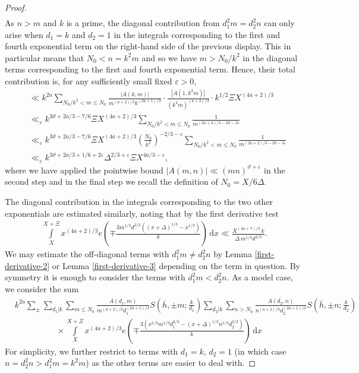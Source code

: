 \documentclass[a4paper,10pt,twoside]{amsart}
\theoremstyle{definition}
\numberwithin{equation}{section}
\newcommand\eps{\varepsilon}
\renewcommand\:{\colon}
\begin{document}
\begin{proof}
\begin{align*}
\end{align*}
As $n>m$ and $k$ is a prime, the diagonal contribution from $d_1^2m=d_2^2n$ can only arise when $d_1=k$ and $d_2=1$ in the integrals corresponding to the first and fourth exponential term on the right-hand side of the previous display. This in particular means that $N_0<n=k^2m$ and so we have $m>N_0/k^2$ in the diagonal terms corresponding to the first and fourth exponential term. Hence, their total contribution is, for any sufficiently small fixed $\varepsilon>0$,
\begin{align}\label{Estimate-2}
&\ll k^{2a}\sum_{N_0/k^2<m\leq N_0}\frac{\left|A\left(k,m\right)\right|}{m^{(a+2)/3}k^{(2a+1)/3}}\cdot\frac{\left|A\left(1,k^2m\right)\right|}{\left(k^2m\right)^{(a+2)/3}}\cdot k^{1/2}\Xi X^{(4a+2)/3} \nonumber\\
&\ll_\eps k^{3\vartheta+2a/3-7/6}\Xi X^{(4a+2)/3}\sum_{N_0/k^2<m\leq N_0}\frac1{m^{(2a+4)/3-2\vartheta-2\varepsilon}} \nonumber\\
&\ll_\eps k^{3\vartheta+2a/3-7/6}\Xi X^{(4a+2)/3}\left(\frac{N_0}{k^2}\right)^{-2/3-\varepsilon}\sum_{N_0/k^2<m\leq N_0}\frac1{m^{(2a+2)/3-2\vartheta-3\varepsilon}} \nonumber\\
&\ll_\eps k^{3\vartheta+2a/3+1/6+2\varepsilon}\Delta^{2/3+\varepsilon}\Xi X^{4a/3-\eps},
\end{align}
where we have applied the pointwise bound $\left|A\left(m,n\right)\right|\ll (mn)^{\vartheta+\varepsilon}$ in the second step and in the final step we recall the definition of $N_0=X/6\Delta$. 

The diagonal contribution in the integrals corresponding to the two other exponentials are estimated similarly, noting that by the first derivative test
\begin{align*}
\int\limits_X^{X+\Xi}x^{(4a+2)/3}e\!\left(\mp\frac{3m^{1/3}d^{2/3}\left(\left(x+\Delta\right)^{1/3}-x^{1/3}\right)}k\right)\,\mathrm d x\ll\frac{X^{(4a+7)/3}\,k}{\Delta\,m^{1/3}d^{2/3}}.
\end{align*}
\noindent We may estimate the off-diagonal terms with $d_1^2m\neq d_2^2n$ by Lemma \ref{first-derivative-2} or Lemma \ref{first-derivative-3} depending on the term in question. By symmetry it is enough to consider the terms with $d_1^2m<d_2^2n$. As a model case, we consider the sum
\begin{align*}
&k^{2a}\sum_\pm\sum_{d_1|k}\sum_{m\leq N_0}\frac{A\left(d_1,m\right)}{m^{(a+2)/3}d_1^{(2a+1)/3}}S\left(\overline h,\pm m;\frac k{d_1}\right)\sum_{d_2|k}\sum_{n> N_0}\frac{\overline{A\left(d_2,n\right)}}{n^{(a+2)/3}d_2^{(2a+1)/3}}S\left(\overline h,\pm n;\frac k{d_2}\right)\\
&\qquad\qquad\quad\times\int\limits_X^{X+\Xi}x^{(4a+2)/3}e\!\left(\mp\frac{3\left(x^{1/3}m^{1/3}d_1^{2/3}-\left(x+\Delta\right)^{1/3}n^{1/3}d_2^{2/3}\right)}k\right)\,\mathrm d x
\end{align*}
For simplicity, we further restrict to terms with $d_1=k$, $d_2=1$ (in which case $n=d_2^2n>d_1^2m=k^2m$) as the other terms are easier to deal with. 


\end{proof}
\end{document}
